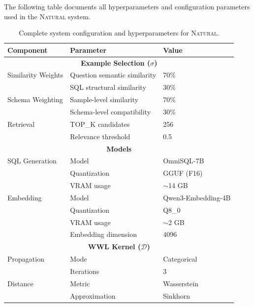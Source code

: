 The following table documents all hyperparameters and configuration parameters
used in the \textsc{Natural} system.

\begin{table}[ht]
\centering
\small
\begin{tabular}{lll}
\toprule
\textbf{Component} & \textbf{Parameter} & \textbf{Value} \\
\midrule
\multicolumn{3}{c}{\textbf{Example Selection ($\sigma$)}} \\
\midrule
Similarity Weights & Question semantic similarity & 70\% \\
                   & SQL structural similarity    & 30\% \\
Schema Weighting   & Sample-level similarity      & 70\% \\
                   & Schema-level compatibility   & 30\% \\
Retrieval          & TOP\_K candidates            & 256 \\
                   & Relevance threshold          & 0.5 \\
\midrule
\multicolumn{3}{c}{\textbf{Models}} \\
\midrule
SQL Generation     & Model                        & OmniSQL-7B \\
                   & Quantization                 & GGUF (F16) \\
                   & VRAM usage                   & $\sim$14 GB \\
Embedding          & Model                        & Qwen3-Embedding-4B \\
                   & Quantization                 & Q8\_0 \\
                   & VRAM usage                   & $\sim$2 GB \\
                   & Embedding dimension          & 4096 \\
\midrule
\multicolumn{3}{c}{\textbf{WWL Kernel ($\mathcal{D}$)}} \\
\midrule
Propagation        & Mode                         & Categorical \\
                   & Iterations                   & 3 \\
Distance           & Metric                       & Wasserstein \\
                   & Approximation                & Sinkhorn \\
\bottomrule
\end{tabular}
\caption{Complete system configuration and hyperparameters for \textsc{Natural}.}
\label{tab:system-config}
\end{table}
